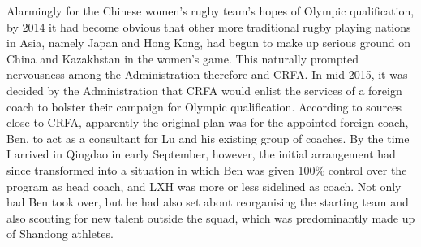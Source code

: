 \begin{CJK}{UTF8}{gbsn}
Alarmingly for the Chinese women's rugby team's hopes of Olympic qualification, by 2014 it had become obvious that other more traditional rugby playing nations in Asia, namely Japan and Hong Kong, had begun to make up serious ground on China and Kazakhstan in the women's game.  This naturally prompted nervousness among the Administration therefore and CRFA.  In mid 2015, it was decided by the Administration that CRFA would enlist the services of a foreign coach to bolster their campaign for Olympic qualification.  According to sources close to CRFA, apparently the original plan was for the appointed foreign coach, Ben, to act as a consultant for Lu and his existing group of coaches.  By the time I arrived in Qingdao in early September, however, the initial arrangement had since transformed into a situation in which Ben was given 100\% control over the program as head coach, and LXH was more or less sidelined as coach. Not only had Ben took over, but he had also set about reorganising the starting team and also scouting for new talent outside the squad, which was predominantly made up of Shandong athletes.



\end{CJK}
